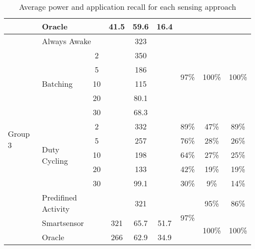 \begin{table*}[t]
{\begin{tabular}{|l|l|c|c|c|c|c|c|c|}
								& \multicolumn{2}{l|}{Oracle}			& 41.5		& 59.6		& 16.4			& 						& 							& 							\\ \hline \hline
	\multirow{14}{*}{Group 3}	& \multicolumn{2}{l|}{Always Awake}						& \multicolumn{3}{c|}{323}				& \multirow{6}{*}{97\%}	& \multirow{6}{*}{100\%}	& \multirow{6}{*}{100\%}	\\ \cline{2-6}
								& \multirow{5}{*}{Batching}		& 2						& \multicolumn{3}{c|}{350}				&						&							&							\\ \cline{3-6}
								& 								& 5						& \multicolumn{3}{c|}{186}				&						&							&							\\ \cline{3-6}
								& 								& 10					& \multicolumn{3}{c|}{115}				&						&							&							\\ \cline{3-6}
								& 								& 20					& \multicolumn{3}{c|}{80.1}				&						&							&							\\ \cline{3-6}
								& 								& 30					& \multicolumn{3}{c|}{68.3}				&						&							&							\\ \cline{2-9}
								& \multirow{5}{*}{Duty Cycling}	& 2						& \multicolumn{3}{c|}{332}				& 89\%					& 47\%						& 89\%						\\ \cline{3-9}
								& 								& 5						& \multicolumn{3}{c|}{257}				& 76\%					& 28\%						& 26\%						\\ \cline{3-9}
								& 								& 10					& \multicolumn{3}{c|}{198}				& 64\%					& 27\%						& 25\%						\\ \cline{3-9}
								& 								& 20					& \multicolumn{3}{c|}{133}				& 42\%					& 19\%						& 19\%						\\ \cline{3-9}
								& 								& 30					& \multicolumn{3}{c|}{99.1}				& 30\%					& 9\%						& 14\%						\\ \cline{2-9}
								& \multicolumn{2}{l|}{Predifined Activity}	& \multicolumn{3}{c|}{321}				& \multirow{3}{*}{97\%}	& 95\%						& 86\%						\\ \cline{2-6}\cline{8-9}
								& \multicolumn{2}{l|}{Smartsensor}	& 321		& 65.7		& 51.7			& 						& \multirow{2}{*}{100\%}	& \multirow{2}{*}{100\%}	\\ \cline{2-6}
								& \multicolumn{2}{l|}{Oracle}			& 266		& 62.9		& 34.9			& 						& 							& 							\\ \hline
    \end{tabular}
}
	\caption{Average power and application recall for each sensing approach}
	\label{table:summaryRecallPower}
\end{table*}


